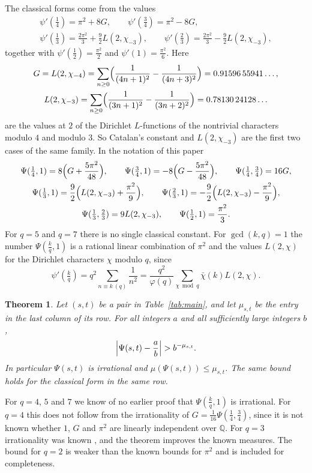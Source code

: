 \documentclass[11pt]{amsart}
\newtheorem{theorem}{Theorem}[section]
\theoremstyle{definition}
\theoremstyle{remark}
\numberwithin{equation}{section}
\newcommand{\Q}{\mathbb Q}
\begin{document}
The classical forms come from the values
\begin{gather*}
 \psi'(\tfrac14)=\pi^2+8G,\qquad \psi'(\tfrac34)=\pi^2-8G,\\
 \psi'(\tfrac13)=\frac{2\pi^2}3+\frac92L(2,\chi_{-3}),\qquad \psi'(\tfrac23)=\frac{2\pi^2}3-\frac92L(2,\chi_{-3}),
\end{gather*}
together with $\psi'(\frac12)=\frac{\pi^2}2$ and $\psi'(1)=\frac{\pi^2}6$. Here
\begin{gather*}
 G=L(2,\chi_{-4})=\sum_{n\ge0}\Bigl(\frac1{(4n+1)^2}-\frac1{(4n+3)^2}\Bigr)=0.91596\,55941\ldots,\\
 L(2,\chi_{-3})=\sum_{n\ge0}\Bigl(\frac1{(3n+1)^2}-\frac1{(3n+2)^2}\Bigr)=0.78130\,24128\ldots
\end{gather*}
are the values at $2$ of the Dirichlet $L$-functions of the nontrivial characters modulo $4$ and modulo $3$. So
Catalan's constant and $L(2,\chi_{-3})$ are the first two cases of the same family. In the notation of this paper
\begin{gather*}
 \Psi(\tfrac14,1)=8\Bigl(G+\frac{5\pi^2}{48}\Bigr),\qquad \Psi(\tfrac34,1)=-8\Bigl(G-\frac{5\pi^2}{48}\Bigr),
 \qquad \Psi(\tfrac14,\tfrac34)=16G,\\
 \Psi(\tfrac13,1)=\frac92\Bigl(L(2,\chi_{-3})+\frac{\pi^2}9\Bigr),\qquad
 \Psi(\tfrac23,1)=-\frac92\Bigl(L(2,\chi_{-3})-\frac{\pi^2}9\Bigr),\\
 \Psi(\tfrac13,\tfrac23)=9L(2,\chi_{-3}),\qquad \Psi(\tfrac12,1)=\frac{\pi^2}3 .
\end{gather*}
For $q=5$ and $q=7$ there is no single classical constant. For $\gcd(k,q)=1$ the number $\Psi(\frac kq,1)$ is a
rational linear combination of $\pi^2$ and the values $L(2,\chi)$ for the Dirichlet characters $\chi$ modulo $q$,
since
\[
 \psi'(\tfrac kq)=q^2\sum_{n\equiv k\ (q)}\frac1{n^2}=\frac{q^2}{\varphi(q)}\sum_{\chi\bmod q}\bar\chi(k)L(2,\chi).
\]

\begin{theorem}\label{thm:main}\label{thm:thirds}\label{thm:fifths}
Let $(s,t)$ be a pair in Table~\ref{tab:main}, and let $\mu_{s,t}$ be the entry in the last column of its row. For all
integers $a$ and all sufficiently large integers $b$,
\[
 \Bigl|\Psi(s,t)-\frac ab\Bigr|>b^{-\mu_{s,t}}.
\]
In particular $\Psi(s,t)$ is irrational and $\mu(\Psi(s,t))\le\mu_{s,t}$. The same bound holds for the classical form in
the same row.
\end{theorem}

For $q=4$, $5$ and $7$ we know of no earlier proof that $\Psi(\frac kq,1)$ is irrational. For $q=4$ this does not
follow from the irrationality of $G=\frac1{16}\Psi(\frac14,\frac34)$, since it is not known whether $1$, $G$ and
$\pi^2$ are linearly independent over $\Q$. For $q=3$ irrationality was known \cite{CDT2024}, and the theorem
improves the known measures. The bound for $q=2$ is weaker than the known bounds for $\pi^2$ and is included for
completeness.
\end{document}
